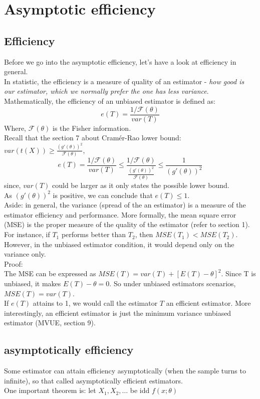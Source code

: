 \documentclass[12pt ]{article}
\begin{document}
\section{Asymptotic efficiency}
\subsection{Efficiency}
Before we go into the asymptotic efficiency, let's have a look at efficiency in general. \\
In statistic, the efficiency is a measure of quality of an estimator - \textit{how good is our estimator, which we normally prefer the one has less variance}.\\

Mathematically, the efficiency of an unbiased estimator is defined as:
\begin{equation}
e(T) = \frac{1/\mathcal{F}(\theta)}{var(T)}
\end{equation}
Where, $\mathcal{F}(\theta)$ is the Fisher information.\\
Recall that the section 7 about Cramér-Rao lower bound: $var(t(X)) \geq \frac{(g'(\theta))^2}{\mathcal{F}(\theta)}$, 
\begin{equation*}
e(T) = \frac{1/ \mathcal{F}(\theta)}{var(T)} \leq \frac{1/ \mathcal{F}(\theta)}{\frac{(g'(\theta))^2}{\mathcal{F}(\theta)}} \leq \frac{1}{(g'(\theta))^2} 
\end{equation*}
since, $var(T)$ could be larger as it only states the possible lower bound.\\ 
As $(g'(\theta))^2$ is positive, we can conclude that $e(T) \leq 1$. \\

\color{brown}
Aside: in general, the variance (spread of the an estimator) is a measure of the estimator efficiency and performance. More formally, the mean square error (MSE) is the proper measure of the quality of the estimator (refer to section 1). For instance, if $T_{1}$ performs better than $T_{2}$, then $MSE(T_{1}) < MSE(T_{2})$. However, in the unbiased estimator condition, it would depend only on the variance only.\\
Proof: \\ 
The MSE can be expressed as $MSE(T) = var(T) + [E(T) - \theta]^2$. Since T is unbiased, it makes $E(T) - \theta = 0$. So under unbiased estimators scenarios, $MSE(T) = var(T)$. \\

\color{black}
If $e(T)$ attains to 1, we would call the estimator $T$ an efficient estimator. More interestingly, an efficient estimator is just the minimum variance unbiased estimator (MVUE, section 9).

\subsection{asymptotically efficiency}
Some estimator can attain efficiency asymptotically (when the sample turns to infinite), so that called asymptotically efficient estimators. \\
One important theorem is: let $X_{1}, X_{2}, \ldots$ be idd $f(x; \theta)$
\end{document}
